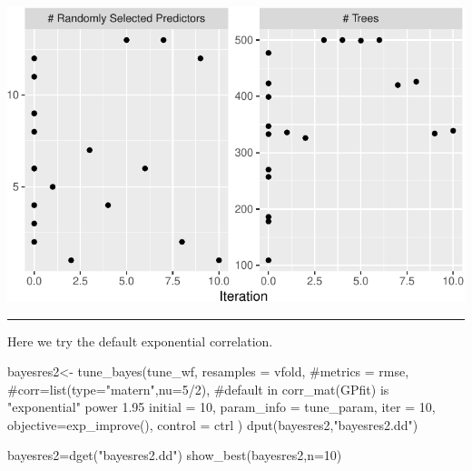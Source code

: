 \documentclass[
  letterpaper,
  DIV=11,
  numbers=noendperiod]{scrartcl}
\newenvironment{Shaded}{\begin{snugshade}}{\end{snugshade}}
\newcommand{\AttributeTok}[1]{\textcolor[rgb]{0.40,0.45,0.13}{#1}}
\newcommand{\CommentTok}[1]{\textcolor[rgb]{0.37,0.37,0.37}{#1}}
\newcommand{\DecValTok}[1]{\textcolor[rgb]{0.68,0.00,0.00}{#1}}
\newcommand{\FunctionTok}[1]{\textcolor[rgb]{0.28,0.35,0.67}{#1}}
\newcommand{\NormalTok}[1]{\textcolor[rgb]{0.00,0.23,0.31}{#1}}
\newcommand{\OtherTok}[1]{\textcolor[rgb]{0.00,0.23,0.31}{#1}}
\newcommand{\StringTok}[1]{\textcolor[rgb]{0.13,0.47,0.30}{#1}}
\begin{document}
\includegraphics{L16_files/figure-pdf/unnamed-chunk-4-2.pdf}

\begin{center}\rule{0.5\linewidth}{0.5pt}\end{center}

Here we try the default exponential correlation.

\begin{Shaded}
\begin{Highlighting}[]
\NormalTok{bayesres2}\OtherTok{\textless{}{-}} \FunctionTok{tune\_bayes}\NormalTok{(tune\_wf,}
    \AttributeTok{resamples =}\NormalTok{ vfold,}
    \CommentTok{\#metrics = rmse,}
    \CommentTok{\#corr=list(type="matern",nu=5/2), }
    \CommentTok{\#default in corr\_mat(GPfit) is "exponential" power 1.95}
    \AttributeTok{initial =} \DecValTok{10}\NormalTok{,}
    \AttributeTok{param\_info =}\NormalTok{ tune\_param,}
    \AttributeTok{iter =} \DecValTok{10}\NormalTok{,}
    \AttributeTok{objective=}\FunctionTok{exp\_improve}\NormalTok{(),}
    \AttributeTok{control =}\NormalTok{ ctrl}
\NormalTok{  )}
\FunctionTok{dput}\NormalTok{(bayesres2,}\StringTok{"bayesres2.dd"}\NormalTok{)}
\end{Highlighting}
\end{Shaded}

\begin{Shaded}
\begin{Highlighting}[]
\NormalTok{bayesres2}\OtherTok{=}\FunctionTok{dget}\NormalTok{(}\StringTok{"bayesres2.dd"}\NormalTok{)}
\FunctionTok{show\_best}\NormalTok{(bayesres2,}\AttributeTok{n=}\DecValTok{10}\NormalTok{)}
\end{Highlighting}
\end{Shaded}
\end{document}
